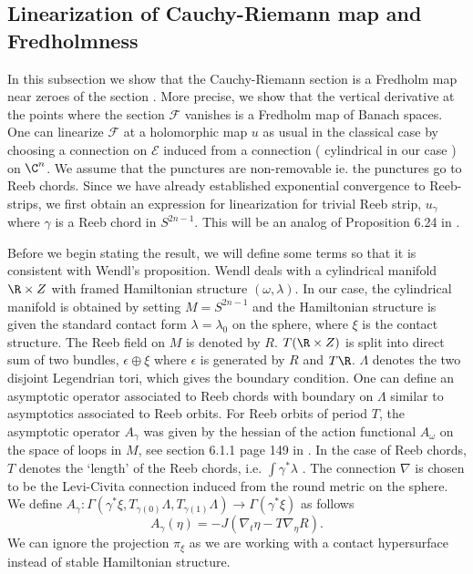 \subsection{Linearization of Cauchy-Riemann map and Fredholmness}

In this subsection we show that the Cauchy-Riemann section  is a Fredholm map near zeroes of the section . More precise, we show that the vertical derivative at the points where the section $\mathcal{F}$ vanishes is a Fredholm map of Banach spaces. One can linearize $\mathcal{F}$ at a holomorphic map $u$ as usual in the classical case by choosing a connection on $\mathcal{E}$ induced from a connection  ( cylindrical in our case ) on $\C^n$. We assume that the punctures are non-removable ie. the punctures go to Reeb chords. Since we have already established exponential convergence to Reeb-strips, we first obtain an expression for linearization for trivial Reeb strip, $u_\gamma$ where $\gamma$ is a Reeb chord in $S^{2n-1}$. This will be an analog of  Proposition 6.24 in \cite{wendlSFT}.

Before we begin stating the result, we will define some terms so that it is consistent with Wendl's proposition. Wendl deals with a  cylindrical manifold $\R \times Z$ with framed Hamiltonian structure $(\omega,\lambda)$. In our case, the cylindrical manifold is obtained by setting $M=S^{2n-1}$ and the Hamiltonian structure is given the standard contact form $\lambda = \lambda_0$ on the sphere, where $\xi$ is the contact structure. The Reeb field on $M$ is denoted by $R$. $T(\R \times Z) $ is split into direct sum of two bundles, $\epsilon \oplus \xi$  where $\epsilon$ is generated by $R$ and $T\R$. $\Lambda$ denotes the two disjoint Legendrian tori, which gives the boundary condition. One can define an asymptotic operator associated to Reeb chords with boundary on $\Lambda$  similar to asymptotics associated to Reeb orbits. For Reeb orbits of period $T$, the asymptotic operator $A_\gamma$ was given by the hessian of the action functional $A_\omega$ on the space of loops in  $M$, see section 6.1.1 page 149 in \cite{wendlSFT} . In the case of Reeb chords, $T$ denotes the `length' of the Reeb chords, i.e. $\int \gamma^* \lambda$ . The connection $\nabla$ is chosen to be the Levi-Civita connection induced from the round metric on the sphere. We define  $A_\gamma  : \Gamma (\gamma^* \xi, T_{\gamma(0)}\Lambda, T_{\gamma(1)}\Lambda) \to \Gamma (\gamma^* \xi)  $  as follows $$A_\gamma(\eta)=-J(\nabla_t \eta - T\nabla_\eta R).$$ 
We can ignore the projection $\pi_\xi$ as we are working with a contact hypersurface instead of stable Hamiltonian structure.


